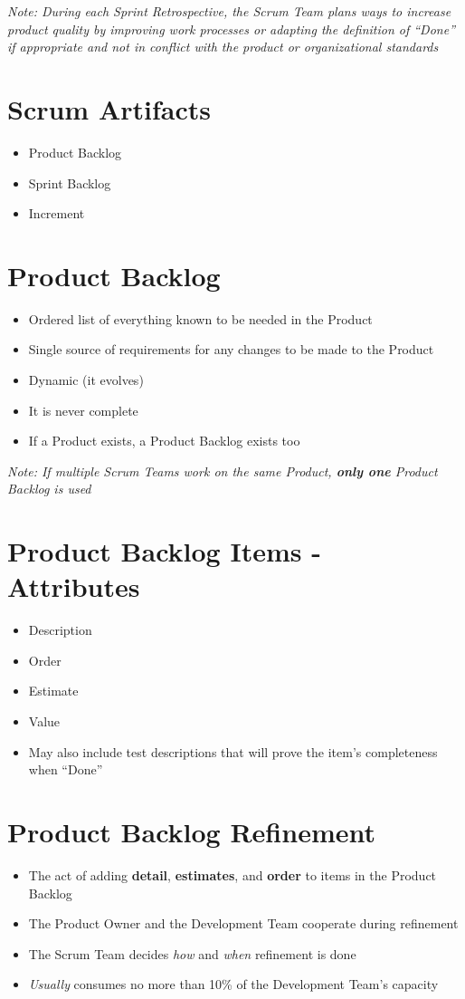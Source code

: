 \documentclass[a4paper,11pt,twocolumn]{article}
\begin{document}
\textit{Note: During each Sprint Retrospective, the Scrum Team plans ways to increase product quality by improving work processes or adapting the definition of ``Done'' if appropriate and not in conflict with the product or organizational standards}

\section*{Scrum Artifacts}
\begin{itemize}
	\item Product Backlog
	\item Sprint Backlog
	\item Increment
\end{itemize}

\section*{Product Backlog}
\begin{itemize}
	\item Ordered list of everything known to be needed in the Product
	\item Single source of requirements for any changes to be made to the Product
	\item Dynamic (it evolves)
	\item It is never complete
	\item If a Product exists, a Product Backlog exists too
\end{itemize}

\textit{Note: If multiple Scrum Teams work on the same Product, \textbf{only one} Product Backlog is used}

\section*{Product Backlog Items - Attributes}
\begin{itemize}
	\item Description
    \item Order
    \item Estimate
    \item Value
    \item May also include test descriptions that will prove the item's completeness when ``Done''
\end{itemize}

\section*{Product Backlog Refinement}
\begin{itemize}
	\item The act of adding \textbf{detail}, \textbf{estimates}, and \textbf{order} to items in the Product Backlog
	\item The Product Owner and the Development Team cooperate during refinement
	\item The Scrum Team decides \textit{how} and \textit{when} refinement is done
	\item \textit{Usually} consumes no more than 10\% of the Development Team's capacity
\end{itemize}
\end{document}
